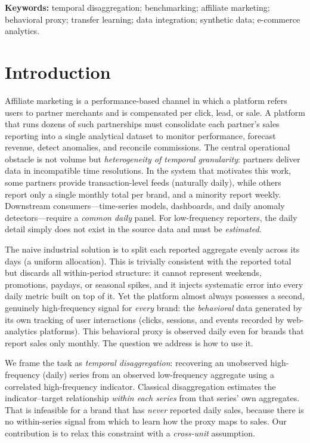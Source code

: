 \documentclass[11pt]{article}
\begin{document}
\noindent\textbf{Keywords:} temporal disaggregation; benchmarking; affiliate
marketing; behavioral proxy; transfer learning; data integration; synthetic
data; e-commerce analytics.

\section{Introduction}

Affiliate marketing is a performance-based channel in which a platform refers
users to partner merchants and is compensated per click, lead, or sale. A
platform that runs dozens of such partnerships must consolidate each partner's
sales reporting into a single analytical dataset to monitor performance,
forecast revenue, detect anomalies, and reconcile commissions. The central
operational obstacle is not volume but \emph{heterogeneity of temporal
granularity}: partners deliver data in incompatible time resolutions. In the
system that motivates this work, some partners provide transaction-level feeds
(naturally daily), while others report only a single monthly total per brand,
and a minority report weekly. Downstream consumers---time-series models,
dashboards, and daily anomaly detectors---require a \emph{common daily} panel.
For low-frequency reporters, the daily detail simply does not exist in the
source data and must be \emph{estimated}.

The naive industrial solution is to split each reported aggregate evenly across
its days (a uniform allocation). This is trivially consistent with the reported
total but discards all within-period structure: it cannot represent weekends,
promotions, paydays, or seasonal spikes, and it injects systematic error into
every daily metric built on top of it. Yet the platform almost always possesses
a second, genuinely high-frequency signal for \emph{every} brand: the
\emph{behavioral} data generated by its own tracking of user interactions
(clicks, sessions, and events recorded by web-analytics platforms). This
behavioral proxy is observed daily even for brands that report sales only
monthly. The question we address is how to use it.

We frame the task as \emph{temporal disaggregation}: recovering an unobserved
high-frequency (daily) series from an observed low-frequency aggregate using a
correlated high-frequency indicator. Classical disaggregation
\citep{ChowLin1971,Denton1971,Fernandez1981,Litterman1983} estimates the
indicator--target relationship \emph{within each series} from that series' own
aggregates. That is infeasible for a brand that has \emph{never} reported daily
sales, because there is no within-series signal from which to learn how the
proxy maps to sales. Our contribution is to relax this constraint with a
\emph{cross-unit} assumption.
\end{document}
